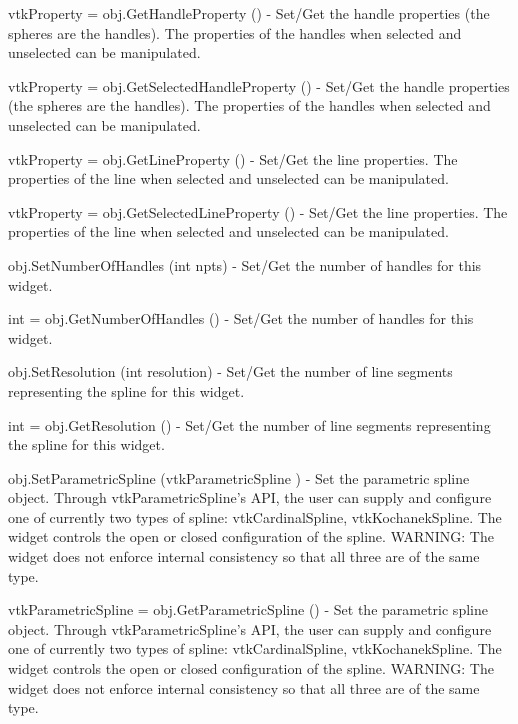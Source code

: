\begin{DoxyItemize}
\item {\ttfamily vtk\-Property = obj.\-Get\-Handle\-Property ()} -\/ Set/\-Get the handle properties (the spheres are the handles). The properties of the handles when selected and unselected can be manipulated.  
\item {\ttfamily vtk\-Property = obj.\-Get\-Selected\-Handle\-Property ()} -\/ Set/\-Get the handle properties (the spheres are the handles). The properties of the handles when selected and unselected can be manipulated.  
\item {\ttfamily vtk\-Property = obj.\-Get\-Line\-Property ()} -\/ Set/\-Get the line properties. The properties of the line when selected and unselected can be manipulated.  
\item {\ttfamily vtk\-Property = obj.\-Get\-Selected\-Line\-Property ()} -\/ Set/\-Get the line properties. The properties of the line when selected and unselected can be manipulated.  
\item {\ttfamily obj.\-Set\-Number\-Of\-Handles (int npts)} -\/ Set/\-Get the number of handles for this widget.  
\item {\ttfamily int = obj.\-Get\-Number\-Of\-Handles ()} -\/ Set/\-Get the number of handles for this widget.  
\item {\ttfamily obj.\-Set\-Resolution (int resolution)} -\/ Set/\-Get the number of line segments representing the spline for this widget.  
\item {\ttfamily int = obj.\-Get\-Resolution ()} -\/ Set/\-Get the number of line segments representing the spline for this widget.  
\item {\ttfamily obj.\-Set\-Parametric\-Spline (vtk\-Parametric\-Spline )} -\/ Set the parametric spline object. Through vtk\-Parametric\-Spline's A\-P\-I, the user can supply and configure one of currently two types of spline\-: vtk\-Cardinal\-Spline, vtk\-Kochanek\-Spline. The widget controls the open or closed configuration of the spline. W\-A\-R\-N\-I\-N\-G\-: The widget does not enforce internal consistency so that all three are of the same type.  
\item {\ttfamily vtk\-Parametric\-Spline = obj.\-Get\-Parametric\-Spline ()} -\/ Set the parametric spline object. Through vtk\-Parametric\-Spline's A\-P\-I, the user can supply and configure one of currently two types of spline\-: vtk\-Cardinal\-Spline, vtk\-Kochanek\-Spline. The widget controls the open or closed configuration of the spline. W\-A\-R\-N\-I\-N\-G\-: The widget does not enforce internal consistency so that all three are of the same type.  

\end{DoxyItemize}
